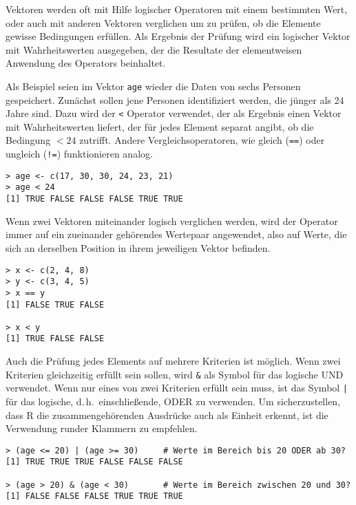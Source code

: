 Vektoren werden oft mit Hilfe logischer Operatoren mit einem bestimmten Wert, oder auch mit anderen Vektoren verglichen um zu prüfen, ob die Elemente gewisse Bedingungen erfüllen. Als Ergebnis der Prüfung wird ein logischer Vektor mit Wahrheitswerten ausgegeben, der die Resultate der elementweisen Anwendung des Operators beinhaltet.

Als Beispiel seien im Vektor \lstinline!age! wieder die Daten von sechs Personen gespeichert. Zunächst sollen jene Personen identifiziert werden, die jünger als $24$ Jahre sind. Dazu wird der \lstinline!<! Operator verwendet, der als Ergebnis einen Vektor mit Wahrheitswerten liefert, der für jedes Element separat angibt, ob die Bedingung $< 24$ zutrifft. Andere Vergleichsoperatoren, wie gleich (\lstinline!==!) oder ungleich (\lstinline|!=|) funktionieren analog.
\begin{lstlisting}
> age <- c(17, 30, 30, 24, 23, 21)
> age < 24
[1] TRUE FALSE FALSE FALSE TRUE TRUE
\end{lstlisting}

Wenn zwei Vektoren miteinander logisch verglichen werden, wird der Operator immer auf ein zueinander gehörendes Wertepaar angewendet, also auf Werte, die sich an derselben Position in ihrem jeweiligen Vektor befinden.
\begin{lstlisting}
> x <- c(2, 4, 8)
> y <- c(3, 4, 5)
> x == y
[1] FALSE TRUE FALSE

> x < y
[1] TRUE FALSE FALSE
\end{lstlisting}

Auch die Prüfung jedes Elements auf mehrere Kriterien ist möglich. Wenn zwei Kriterien gleichzeitig erfüllt sein sollen, wird \lstinline!&! als Symbol für das logische UND verwendet. Wenn nur eines von zwei Kriterien erfüllt sein muss, ist das\index[func]{\textbar@\texttt{\textbar, \textbar\textbar}} Symbol \lstinline!|! für das logische, d.\,h.\ einschließende, ODER zu verwenden. Um sicherzustellen, dass R die zusammengehörenden Ausdrücke auch als Einheit erkennt, ist die Verwendung runder Klammern zu empfehlen.
\begin{lstlisting}
> (age <= 20) | (age >= 30)     # Werte im Bereich bis 20 ODER ab 30?
[1] TRUE TRUE TRUE FALSE FALSE FALSE

> (age > 20) & (age < 30)       # Werte im Bereich zwischen 20 und 30?
[1] FALSE FALSE FALSE TRUE TRUE TRUE
\end{lstlisting}

